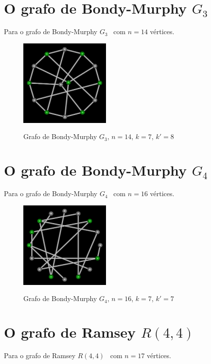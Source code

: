 \section{O grafo de Bondy-Murphy $G_3$}
Para o grafo de Bondy-Murphy $G_3$~\cite{cite:example-bondy} com $n=14$
vértices.

\begin{figure}[htb]
\centering
\includegraphics[width=0.4\textwidth]{img/bondymurphyg3.png}
\label{fig:example-bondymurphyg3}
\caption{Grafo de Bondy-Murphy $G_3$, $n=14$, $k=7$, $k'=8$}
\end{figure}


\section{O grafo de Bondy-Murphy $G_4$}
Para o grafo de Bondy-Murphy $G_4$~\cite{cite:example-bondy} com $n=16$
vértices.

\begin{figure}[htb]
\centering
\includegraphics[width=0.4\textwidth]{img/bondymurphyg4.png}
\label{fig:example-bondymurphyg4}
\caption{Grafo de Bondy-Murphy $G_4$, $n=16$, $k=7$, $k'=7$}
\end{figure}


\section{O grafo de Ramsey $R(4,4)$}
Para o grafo de Ramsey $R(4,4)$~\cite{cite:example-ramsey} com $n=17$
vértices.

